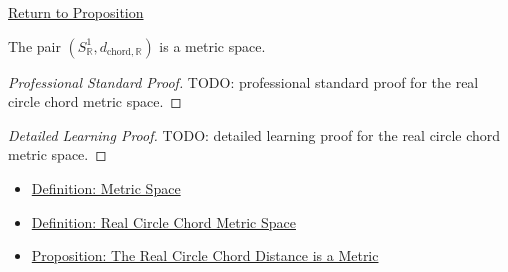 \newpage
{}
\label{prf:real-circle-chord-metric-space}

\begin{remark*}[Return]
\hyperref[prop:real-circle-chord-metric-space]{Return to Proposition}
\end{remark*}

\begin{proposition*}
The pair \((S^1_{\mathbb{R}},d_{\mathrm{chord},\mathbb{R}})\) is a metric
space.
\end{proposition*}

\begin{proof}[Professional Standard Proof]
\LRAProofBodyStart
TODO: professional standard proof for the real circle chord metric space.
\end{proof}

\begin{proof}[Detailed Learning Proof]
\LRAProofBodyStart
TODO: detailed learning proof for the real circle chord metric space.
\end{proof}

\begin{remark*}
\end{remark*}

\begin{dependencies}
\begin{itemize}
  \item \hyperref[def:metric-space]{Definition: Metric Space}
  \item \hyperref[def:real-circle-chord-metric-space]{Definition: Real Circle Chord Metric Space}
  \item \hyperref[prop:real-circle-chord-metric]{Proposition: The Real Circle Chord Distance is a Metric}
\end{itemize}
\end{dependencies}

\clearpage
